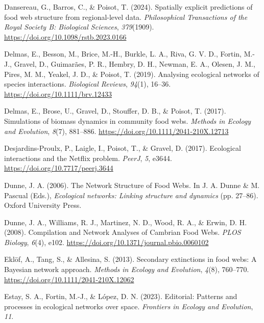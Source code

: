 \documentclass[
]{article}
\newlength{\cslhangindent}
\newenvironment{CSLReferences}[2] %
 {\begin{list}{}{%
  \setlength{\itemindent}{0pt}
  \setlength{\leftmargin}{0pt}
  \setlength{\parsep}{0pt}
  \ifodd #1
   \setlength{\leftmargin}{\cslhangindent}
   \setlength{\itemindent}{-1\cslhangindent}
  \fi
  \setlength{\itemsep}{#2\baselineskip}}}
 {\end{list}}
\begin{document}
\begin{CSLReferences}{1}{0}
Dansereau, G., Barros, C., \& Poisot, T. (2024). Spatially explicit
predictions of food web structure from regional-level data.
\emph{Philosophical Transactions of the Royal Society B: Biological
Sciences}, \emph{379}(1909).
\url{https://doi.org/10.1098/rstb.2023.0166}

Delmas, E., Besson, M., Brice, M.-H., Burkle, L. A., Riva, G. V. D.,
Fortin, M.-J., Gravel, D., Guimarães, P. R., Hembry, D. H., Newman, E.
A., Olesen, J. M., Pires, M. M., Yeakel, J. D., \& Poisot, T. (2019).
Analysing ecological networks of species interactions. \emph{Biological
Reviews}, \emph{94}(1), 16--36. \url{https://doi.org/10.1111/brv.12433}

Delmas, E., Brose, U., Gravel, D., Stouffer, D. B., \& Poisot, T.
(2017). Simulations of biomass dynamics in community food webs.
\emph{Methods in Ecology and Evolution}, \emph{8}(7), 881--886.
\url{https://doi.org/10.1111/2041-210X.12713}

Desjardins-Proulx, P., Laigle, I., Poisot, T., \& Gravel, D. (2017).
Ecological interactions and the {Netflix} problem. \emph{PeerJ},
\emph{5}, e3644. \url{https://doi.org/10.7717/peerj.3644}

Dunne, J. A. (2006). The {Network Structure} of {Food Webs}. In J. A.
Dunne \& M. Pascual (Eds.), \emph{Ecological networks: {Linking}
structure and dynamics} (pp. 27--86). Oxford University Press.

Dunne, J. A., Williams, R. J., Martinez, N. D., Wood, R. A., \& Erwin,
D. H. (2008). Compilation and {Network Analyses} of {Cambrian Food
Webs}. \emph{PLOS Biology}, \emph{6}(4), e102.
\url{https://doi.org/10.1371/journal.pbio.0060102}

Eklöf, A., Tang, S., \& Allesina, S. (2013). Secondary extinctions in
food webs: A {Bayesian} network approach. \emph{Methods in Ecology and
Evolution}, \emph{4}(8), 760--770.
\url{https://doi.org/10.1111/2041-210X.12062}

Estay, S. A., Fortin, M.-J., \& López, D. N. (2023). Editorial:
{Patterns} and processes in ecological networks over space.
\emph{Frontiers in Ecology and Evolution}, \emph{11}.


\end{CSLReferences}
\end{document}
